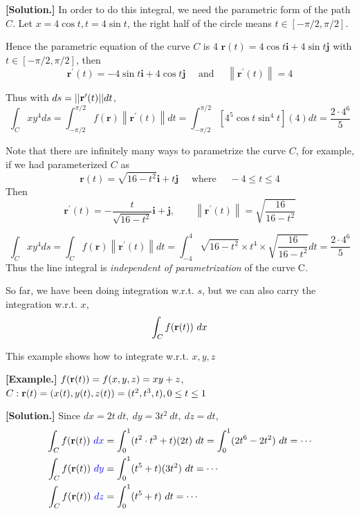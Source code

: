 \documentclass[11pt, a4paper]{MATH2023}
\newcommand{\eg}{\textbf{[Example.] }}
\newcommand{\sol}{\textbf{[Solution.] }}
\newcommand{\rr}{{\bf r}}
\begin{document}
\begin{spacing}{1.3}
    \sol In order to do this integral, we need the parametric form of the path $C$.
    Let $x=4\cos t, t=4\sin t$, the right half of the circle means $t \in[-\pi / 2, \pi / 2]$.

    Hence the parametric equation of the curve $C$ is
    4
    $\mathbf{r}(t)=4 \cos t \mathbf{i}+4 \sin t \mathbf{j}$ with $t \in[-\pi / 2, \pi / 2]$, then
    $$\mathbf{r}^{\prime}(t)=-4 \sin t \mathbf{i}+4 \cos t \mathbf{j} \quad \text { and } \quad\left\|\mathbf{r}^{\prime}(t)\right\|=4$$

    Thus with $ds=||\rr'(t)|| dt$,
    $$\int_{C} x y^{4} d s =\int_{-\pi / 2}^{\pi / 2} f(\mathbf{r})\left\|\mathbf{r}^{\prime}(t)\right\| d t=
    \int_{-\pi / 2}^{\pi / 2}\left[4^{5} \cos t \sin ^{4} t\right](4) d t =\frac{2\cdot 4^6}{5}$$

    {\blue Note that there are infinitely many ways to parametrize the curve $C$, }
    for example, if we had parameterized $C$ as
    $$\mathbf{r}(t)=\sqrt{16-t^{2}} \mathbf{i}+t \mathbf{j} \quad \text { where } \quad-4 \leqslant t \leqslant 4$$
    Then
    $$\mathbf{r}^{\prime}(t) =-\frac{t}{\sqrt{16-t^{2}}} \mathbf{i}+\mathbf{j}, \qquad
    \left\|\mathbf{r}^{\prime}(t)\right\| =\sqrt{\frac{16}{16-t^{2}}} $$

    $$ \int_{C} x y^{4} d s =\int_{C} f(\mathbf{r})\left\|\mathbf{r}^{\prime}(t)\right\| d t
    =\int_{-4}^{4} \sqrt{16-t^{2}} \times t^{4} \times \sqrt{\frac{16}{16-t^{2}}} d t=\frac{2\cdot 4^6}{5}$$
    Thus the line integral is {\it \blue independent of parametrization} of the curve C.

    So far, we have been doing integration w.r.t. $s$, but we can also carry the integration w.r.t. $x$,
    $$\int_C f(\rr(t))\ dx$$

    \vspace{0.3in}
    {\blue This example shows how to integrate w.r.t. $x,y,z$}

    \eg $f(\rr(t))=f(x,y,z)=xy+z$, $C: \rr(t)=(x(t), y(t), z(t)) = (t^2, t^3, t), 0\le t\le 1$

    \sol Since $dx=2t\ dt,\ dy=3t^2\ dt,\ dz=dt$,
    \begin{align*}
        \int_C f(\rr(t))\ {\blue dx} &= \int_0^1 (t^2\cdot t^3+t)(2t)\ dt=\int_0^1 (2t^6-2t^2)\ dt=\cdots\\
        \int_C f(\rr(t))\ {\blue dy} &= \int_0^1 (t^5+t)(3t^2)\ dt=\cdots\\
        \int_C f(\rr(t))\ {\blue dz} &= \int_0^1 (t^5+t)\ dt=\cdots
    \end{align*}


\end{spacing}
\end{document}

